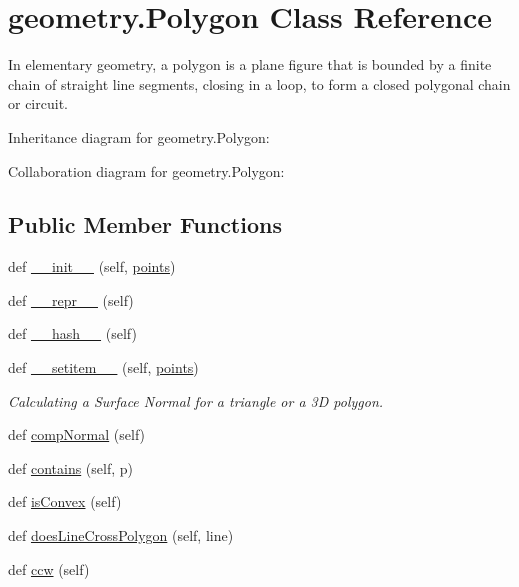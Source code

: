 \hypertarget{classgeometry_1_1Polygon}{}\section{geometry.\+Polygon Class Reference}
\label{classgeometry_1_1Polygon}


In elementary geometry, a polygon is a plane figure that is bounded by a finite chain of straight line segments, closing in a loop, to form a closed polygonal chain or circuit.  




Inheritance diagram for geometry.\+Polygon\+:


Collaboration diagram for geometry.\+Polygon\+:
\subsection*{Public Member Functions}
\begin{DoxyCompactItemize}
\item 
def \hyperlink{classgeometry_1_1Polygon_a46b21b7c846c26d6ff1171cc9a29d0c5}{\+\_\+\+\_\+init\+\_\+\+\_\+} (self, \hyperlink{classgeometry_1_1Polygon_aa0fda1ff74a09b8498bd7d8731b2fbf1}{points})
\item 
def \hyperlink{classgeometry_1_1Polygon_a9c05f0f70dbb5652e29265671b036c71}{\+\_\+\+\_\+repr\+\_\+\+\_\+} (self)
\item 
def \hyperlink{classgeometry_1_1Polygon_ac597f93df5686912dc1ca6eddc65b6b8}{\+\_\+\+\_\+hash\+\_\+\+\_\+} (self)
\item 
def \hyperlink{classgeometry_1_1Polygon_ab790ce2e27479f63d26cf2fe0d177482}{\+\_\+\+\_\+setitem\+\_\+\+\_\+} (self, \hyperlink{classgeometry_1_1Polygon_aa0fda1ff74a09b8498bd7d8731b2fbf1}{points})
\begin{DoxyCompactList}\small\item\em Calculating a Surface Normal for a triangle or a 3D polygon. \end{DoxyCompactList}\item 
def \hyperlink{classgeometry_1_1Polygon_aa39e7d0353ffad956679321aca725d35}{comp\+Normal} (self)
\item 
def \hyperlink{classgeometry_1_1Polygon_a64880abb26797d5ad564a6f0399b216c}{contains} (self, p)
\item 
def \hyperlink{classgeometry_1_1Polygon_a4836c37e04dc0eb76809904538b77e7c}{is\+Convex} (self)
\item 
def \hyperlink{classgeometry_1_1Polygon_ae4ab82f837783f51b39a41427e46f5df}{does\+Line\+Cross\+Polygon} (self, line)
\item 
def \hyperlink{classgeometry_1_1Polygon_a4c6914db65978bbd2232f28bbb41b69b}{ccw} (self)
\end{DoxyCompactItemize}
